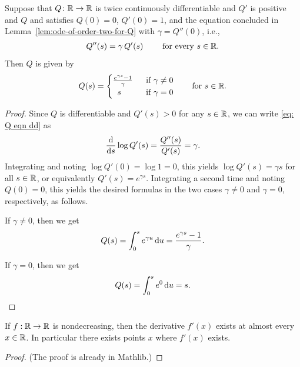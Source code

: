 \begin{lemma}
  \label{lem:solve-Q}
  \leanok
  Suppose that $Q \colon \mathbb{R} \to \mathbb{R}$ is twice continuously differentiable
  and $Q'$ is positive and $Q$
  and satisfies $Q(0)=0$, $Q'(0) = 1$, and the equation concluded in
  Lemma~\ref{lem:ode-of-order-two-for-Q} with $\gamma = Q''(0)$, i.e.,
  \begin{align}\label{eq: Q eqn dd}
  Q''(s) = \gamma \, Q'(s) \qquad \text{ for every } s \in \mathbb{R} .
  \end{align}
  Then $Q$ is given by
  \begin{align*}
  Q(s) = \begin{cases}
    \frac{e^{\gamma s} - 1}{\gamma} & \; \text{ if $\gamma \ne 0$} \\
    \;\; s & \; \text{ if $\gamma = 0$}
    \end{cases}
    \qquad \text{for $s \in \mathbb{R}$.}
  \end{align*}
  \end{lemma}
\begin{proof}
  \leanok
  Since $Q$ is differentiable and $Q'(s)>0$ for any $s \in \mathbb{R}$,
  we can write \eqref{eq: Q eqn dd} as
  \begin{align*}
  \frac{\mathrm{d}}{\mathrm{d} s} \log Q'(s)
    = \frac{Q''(s)}{Q'(s)}
    = \gamma .
  \end{align*}
  Integrating and noting $\log Q'(0) = \log 1 = 0$, this
  yields $\log Q'(s) = \gamma s$ for all $s \in \mathbb{R}$, or equivalently
  $Q'(s) = e^{\gamma s}$. Integrating a second time
  and noting $Q(0) = 0$, this yields the desired formulas
  in the two cases $\gamma \ne 0$ and $\gamma = 0$, respectively, as follows.

  If $\gamma \ne 0$, then we get
  \begin{align*}
  Q(s) = \int_0^s e^{\gamma u} \, \mathrm{d} u = \frac{e^{\gamma s} - 1}{\gamma} .
  \end{align*}

  If $\gamma = 0$, then we get
  \begin{align*}
  Q(s) = \int_0^s e^0 \, \mathrm{d} u = s .
  \end{align*}
\end{proof}

\begin{theorem}
  \label{thm:monotone-ae-differentiable}
  \leanok
  \mathlibok
  If $f : \mathbb{R} \to \mathbb{R}$ is nondecreasing, then the derivative
  $f'(x)$ exists at almost every $x \in \mathbb{R}$.
  In particular there exists points $x$ where $f'(x)$ exists.
\end{theorem}
\begin{proof}
  \leanok
  \mathlibok
  (The proof is already in Mathlib.)
\end{proof}

